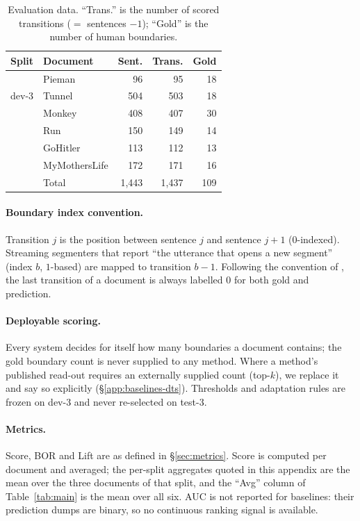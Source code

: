 \begin{table}[t]
\centering\small
\begin{tabular}{@{}llrrr@{}}
\toprule
Split & Document & Sent. & Trans. & Gold \\
\midrule
\multirow{3}{*}{dev-3}
 & Pieman        &  96 &  95 & 18 \\
 & Tunnel        & 504 & 503 & 18 \\
 & Monkey        & 408 & 407 & 30 \\
\addlinespace
\multirow{3}{*}{test-3}
 & Run           & 150 & 149 & 14 \\
 & GoHitler      & 113 & 112 & 13 \\
 & MyMothersLife & 172 & 171 & 16 \\
\midrule
 & Total         & 1{,}443 & 1{,}437 & 109 \\
\bottomrule
\end{tabular}
\caption{Evaluation data. ``Trans.'' is the number of scored transitions
($=$ sentences $-1$); ``Gold'' is the number of human boundaries.}
\label{tab:app-eval-data}
\end{table}

\paragraph{Boundary index convention.}
Transition $j$ is the position between sentence $j$ and sentence $j+1$
($0$-indexed). Streaming segmenters that report ``the utterance that opens a new
segment'' (index $b$, $1$-based) are mapped to transition $b-1$. Following the
convention of \citet{jiang2023superdialseg}, the last transition of a document
is always labelled $0$ for both gold and prediction.

\paragraph{Deployable scoring.}
Every system decides for itself how many boundaries a document contains; the
gold boundary count is never supplied to any method. Where a method's published
read-out requires an externally supplied count (top-$k$), we replace it and say
so explicitly (\S\ref{app:baselines-dts}). Thresholds and adaptation rules are
frozen on dev-3 and never re-selected on test-3.

\paragraph{Metrics.}
Score, BOR and Lift are as defined in \S\ref{sec:metrics}. Score is computed per
document and averaged; the per-split aggregates quoted in this appendix are the
mean over the three documents of that split, and the ``Avg'' column of
Table~\ref{tab:main} is the mean over all six.
AUC is not reported for baselines: their prediction dumps are binary, so no
continuous ranking signal is available.

